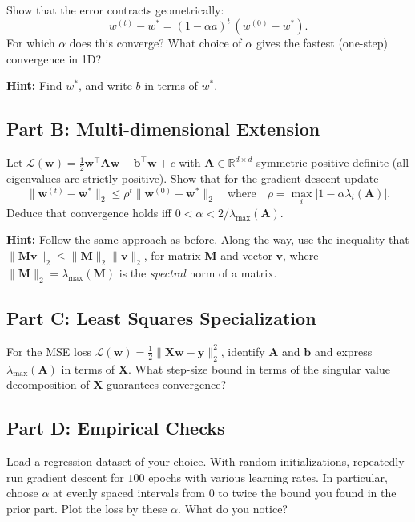 \documentclass{article}
\begin{document}
Show that the error contracts geometrically:
\[
w^{(t)} - w^* = (1 - \alpha a)^t \,(w^{(0)} - w^*).
\]
For which $\alpha$ does this converge? What choice of $\alpha$ gives the fastest (one-step) convergence in 1D?

\textbf{Hint:} Find $w^*$, and write $b$ in terms of $w^*$.

\subsection*{Part B: Multi-dimensional Extension}
Let $\mathcal{L}(\mathbf{w}) = \tfrac12 \mathbf{w}^\top \mathbf{A} \mathbf{w} - \mathbf{b}^\top \mathbf{w} + c$ with $\mathbf{A} \in \mathbb{R}^{d\times d}$ symmetric positive definite (all eigenvalues are strictly positive).
Show that for the gradient descent update 
$$
\|\mathbf{w}^{(t)}-\mathbf{w}^*\|_2 \le \rho^t \|\mathbf{w}^{(0)}-\mathbf{w}^*\|_2
\quad\text{where}\quad
\rho = \max_i |1-\alpha \lambda_i(\mathbf{A})|.
$$
Deduce that convergence holds iff $0<\alpha<2/\lambda_{\max}(\mathbf{A})$.

\textbf{Hint:} Follow the same approach as before. Along the way, use the inequality that $\| \mathbf{M v} \|_2 \leq \| \mathbf{M} \|_2 \|\mathbf{v}\|_2$, for matrix $\mathbf{M}$ and vector $\mathbf{v}$, where $\| \mathbf{M} \|_2 = \lambda_{\text{max}} (\mathbf{M})$ is the \textit{spectral} norm of a matrix.

\subsection*{Part C: Least Squares Specialization}
For the MSE loss $\mathcal{L}(\mathbf{w})=\tfrac1{2}\|\mathbf{X}\mathbf{w}-\mathbf{y}\|_2^2$, identify $\mathbf{A}$ and $\mathbf{b}$ and express $\lambda_{\max}(\mathbf{A})$ in terms of $\mathbf{X}$. What step-size bound in terms of the singular value decomposition of $\mathbf{X}$ guarantees convergence?

\subsection*{Part D: Empirical Checks}

Load a regression dataset of your choice.
With random initializations, repeatedly run gradient descent for $100$ epochs with various learning rates.
In particular, choose $\alpha$ at evenly spaced intervals from $0$ to twice the bound you found in the prior part.
Plot the loss by these $\alpha$.
What do you notice?

%
\end{document}
